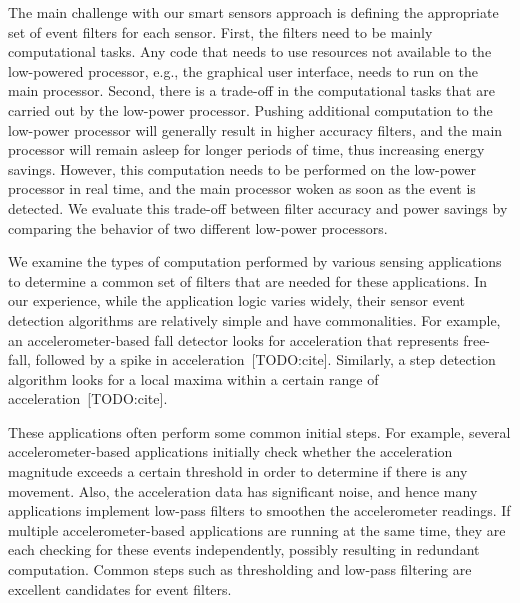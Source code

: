 The main challenge with our smart sensors approach is defining the appropriate
set of event filters for each sensor. First, the filters need to be mainly
computational tasks. Any code that needs to use resources not available to the
low-powered processor, e.g., the graphical user interface, needs to run on the
main processor. Second, there is a trade-off in the computational tasks that are
carried out by the low-power processor. Pushing additional computation to the
low-power processor will generally result in higher accuracy filters, and the
main processor will remain asleep for longer periods of time, thus increasing
energy savings. However, this computation needs to be performed on the low-power
processor in real time, and the main processor woken as soon as the event is
detected. We evaluate this trade-off between filter accuracy and power savings
by comparing the behavior of two different low-power processors.

We examine the types of computation performed by various sensing applications to
determine a common set of filters that are needed for these applications. In our
experience, while the application logic varies widely, their sensor event
detection algorithms are relatively simple and have commonalities. For example,
an accelerometer-based fall detector looks for acceleration that represents
free-fall, followed by a spike in acceleration~[TODO:cite]. Similarly, a step
detection algorithm looks for a local maxima within a certain range of
acceleration~[TODO:cite]. 

These applications often perform some common initial steps. For example, several
accelerometer-based applications initially check whether the acceleration
magnitude exceeds a certain threshold in order to determine if there is any
movement. Also, the acceleration data has significant noise, and hence many
applications implement low-pass filters to smoothen the accelerometer readings.
If multiple accelerometer-based applications are running at the same time, they
are each checking for these events independently, possibly resulting in
redundant computation. Common steps such as thresholding and low-pass filtering
are excellent candidates for event filters.

